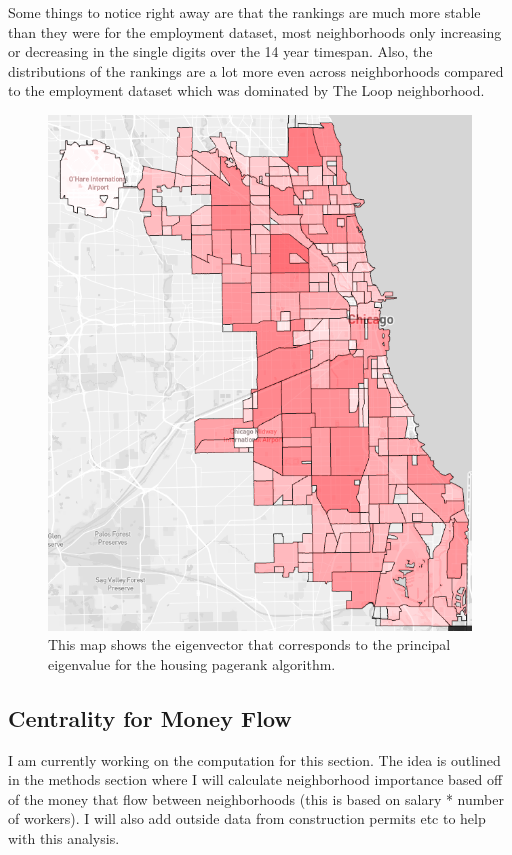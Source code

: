 \documentclass{article}
\theoremstyle{definition}
\theoremstyle{remark}
\begin{document}
Some things to notice right away are that the rankings are much more stable than they were for the employment dataset, most neighborhoods only increasing or decreasing in the single digits over the 14 year timespan.  Also, the distributions of the rankings are a lot more even across neighborhoods compared to the employment dataset which was dominated by The Loop neighborhood. 

\begin{figure}[H]
    \centering
    \includegraphics[width=1.0\textwidth]{Houses-S000-2015}
    \caption{This map shows the eigenvector that corresponds to the principal eigenvalue for the housing pagerank algorithm.}
    \label{fig:Houses-S000-2015}
\end{figure}

\subsection{Centrality for Money Flow}
I am currently working on the computation for this section.  The idea is outlined in the methods section where I will calculate neighborhood importance based off of the money that flow between neighborhoods (this is based on salary * number of workers).  I will also add outside data from construction permits etc to help with this analysis.
\end{document}

